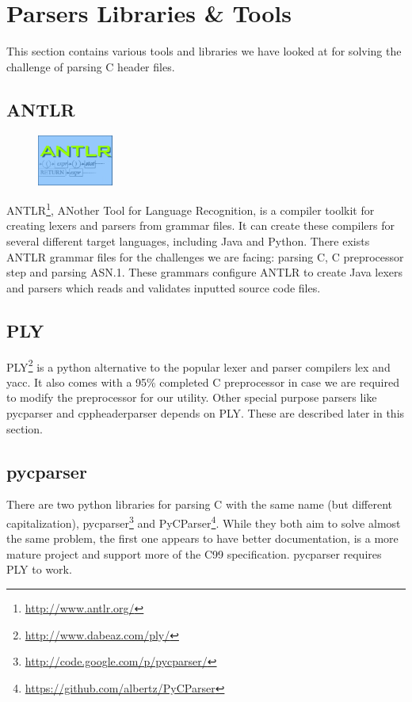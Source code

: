 \section{Parsers Libraries \& Tools}
\label{sec:pre:parsers}
This section contains various tools and libraries we have looked at for solving
the challenge of parsing C header files.

\subsection{ANTLR}
\label{sec:pre:antlr}
\begin{figure}
	\begin{center}
	\vspace{-30pt}
		\includegraphics[width=2.5cm]{./planning/img/antlr_logo}
	\vspace{-30pt}
	\end{center}
\end{figure}
ANTLR\footnote{\url{http://www.antlr.org/}}, ANother Tool for Language
Recognition, is a compiler toolkit for creating lexers and parsers from grammar
files. It can create these compilers for several different target languages,
including Java and Python. There exists ANTLR grammar files for the challenges
we are facing: parsing C, C preprocessor step and parsing ASN.1. These grammars
configure ANTLR to create Java lexers and parsers which reads and validates
inputted source code files.

\subsection{PLY}
PLY\footnote{\url{http://www.dabeaz.com/ply/}} is a python alternative to the
popular lexer and parser compilers lex and yacc. It also comes with a 95\%
completed C preprocessor in case we are required to modify the preprocessor
for our utility. Other special purpose parsers like pycparser and
cppheaderparser depends on PLY. These are described later in this section.

\subsection{pycparser}
There are two python libraries for parsing C with the same name (but different
capitalization), pycparser\footnote{\url{http://code.google.com/p/pycparser/}}
and PyCParser\footnote{\url{https://github.com/albertz/PyCParser}}. While they
both aim to solve almost the same problem, the first one appears to have better
documentation, is a more mature project and support more of the C99
specification. pycparser requires PLY to work.

